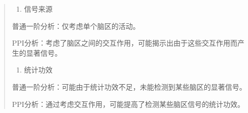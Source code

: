 \documentclass[
]{article}
\providecommand{\tightlist}{%
  \setlength{\itemsep}{0pt}\setlength{\parskip}{0pt}}
\begin{document}
\begin{quote}
\begin{enumerate}
\def\labelenumi{\arabic{enumi}.}
\setcounter{enumi}{2}
\tightlist
\item
  信号来源
\end{enumerate}

普通一阶分析：仅考虑单个脑区的活动。

PPI分析：考虑了脑区之间的交互作用，可能揭示出由于这些交互作用而产生的显著信号。

\begin{enumerate}
\def\labelenumi{\arabic{enumi}.}
\setcounter{enumi}{3}
\tightlist
\item
  统计功效
\end{enumerate}

普通一阶分析：可能由于统计功效不足，未能检测到某些脑区的显著信号。

PPI分析：通过考虑交互作用，可能提高了检测某些脑区信号的统计功效。
\end{quote}
\end{document}
